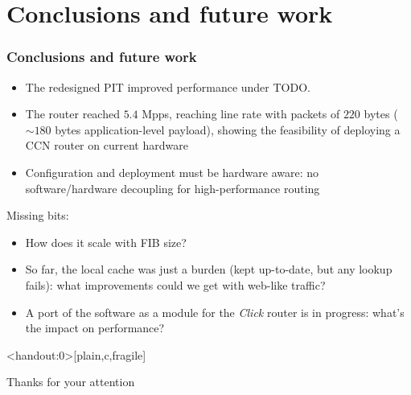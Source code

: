 \section{Conclusions and future work}
\begin{frame}[fragile]
  \frametitle{Conclusions and future work}
  \begin{itemize}
    \item The redesigned PIT improved performance under TODO.
    \item The router reached $5.4$ Mpps, reaching line rate with packets of $220$ bytes ($\sim180$ bytes application-level payload), showing the feasibility of deploying a CCN router on current hardware
    \item Configuration and deployment must be hardware aware: no software/hardware decoupling for high-performance routing
  \end{itemize}

  \onslide<+->
  \onslide<+->
  Missing bits:

  \begin{itemize}
    \item How does it scale with FIB size?
    \item So far, the local cache was just a burden (kept up-to-date, but any lookup fails): what improvements could we get with web-like traffic?
    \item A port of the software as a module for the \emph{Click} router is in progress: what's the impact on performance?
  \end{itemize}
\end{frame}


\begingroup
{}
\begin{frame}<handout:0>[plain,c,fragile]
  \begin{center}
    {\large \inserttitle}

    \vspace{1em}

    {\normalsize Thanks for your attention}
  \end{center}
\end{frame}
\endgroup

